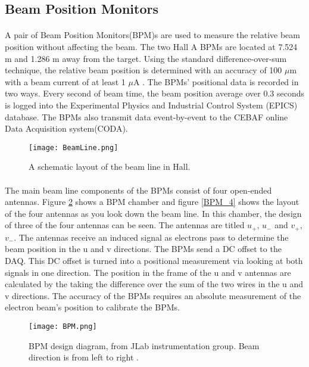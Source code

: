 	 \subsection{Beam Position Monitors}
	 \paragraph{} A pair of Beam Position Monitors(BPM)s are used to measure the relative beam position without affecting the beam. The two Hall A BPMs are located at 7.524 m and 1.286 m away from the target. Using the standard difference-over-sum technique, the relative beam position is determined with an accuracy of 100 $\mu$m with a beam current of at least 1 $\mu$A \cite{HallA}. The BPMs' positional data is recorded in two ways. Every second of beam time, the beam position average over 0.3 seconds is logged into the Experimental Physics and Industrial Control System (EPICS) database. The BPMs also transmit data event-by-event to the CEBAF online Data Acquisition system(CODA).
	 	 	 
 	 	\begin{figure}[t]
 	 		\centering
 	 		\caption{A schematic layout of the beam line in Hall. \cite{HallA} }
	 	 	\label{BeamLine}
	 	 	\texttt{[image: BeamLine.png]} 
	 	 \end{figure} 	
	 	 	
	 \paragraph{} The main beam line components of the BPMs consist of four open-ended antennas. Figure \ref{BPMimg} shows a BPM chamber and figure \ref{BPM_4} shows the layout of the four antennas as you look down the beam line. In this chamber, the design of three of the four antennas can be seen. The antennas are titled $u_+$, $u_-$ and $v_+$, $v_-$. The antennas receive an induced signal as electrons pass to determine the beam position in the u and v directions. The BPMs send a DC offset to the DAQ. This DC offset is turned into a positional measurement via looking at both signals in one direction. The position in the frame of the u and v antennas are calculated by the taking the difference over the sum of the two wires in the u and v directions. The accuracy of the BPMs requires an absolute measurement of the electron beam's position to calibrate the BPMs\cite{BPM,BPM2}.
	 	 	\begin{figure}[t]
	 	 		\centering
	 	 		\caption{BPM design diagram, from JLab instrumentation	group. Beam direction is from left to right \cite{BPM2}. }
	 	 		\label{BPMimg}
	 	 		\texttt{[image: BPM.png]} 
	 	 	\end{figure} 	
	 
